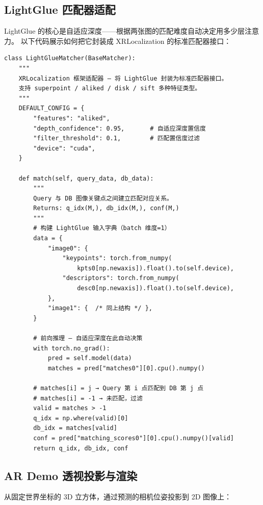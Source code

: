 \documentclass[12pt,a4paper]{ctexart}
\begin{document}
\subsection{LightGlue 匹配器适配}

LightGlue 的核心是自适应深度——根据两张图的匹配难度自动决定用多少层注意力。
以下代码展示如何把它封装成 XRLocalization 的标准匹配器接口：

\begin{lstlisting}[style=pythonstyle, caption={LightGlue 匹配器适配代码}]
class LightGlueMatcher(BaseMatcher):
    """
    XRLocalization 框架适配器 — 将 LightGlue 封装为标准匹配器接口。
    支持 superpoint / aliked / disk / sift 多种特征类型。
    """
    DEFAULT_CONFIG = {
        "features": "aliked",
        "depth_confidence": 0.95,       # 自适应深度置信度
        "filter_threshold": 0.1,        # 匹配置信度过滤
        "device": "cuda",
    }

    def match(self, query_data, db_data):
        """
        Query 与 DB 图像关键点之间建立匹配对应关系。
        Returns: q_idx(M,), db_idx(M,), conf(M,)
        """
        # 构建 LightGlue 输入字典（batch 维度=1）
        data = {
            "image0": {
                "keypoints": torch.from_numpy(
                    kpts0[np.newaxis]).float().to(self.device),
                "descriptors": torch.from_numpy(
                    desc0[np.newaxis]).float().to(self.device),
            },
            "image1": {  /* 同上结构 */ },
        }

        # 前向推理 — 自适应深度在此自动决策
        with torch.no_grad():
            pred = self.model(data)
            matches = pred["matches0"][0].cpu().numpy()

        # matches[i] = j → Query 第 i 点匹配到 DB 第 j 点
        # matches[i] = -1 → 未匹配，过滤
        valid = matches > -1
        q_idx = np.where(valid)[0]
        db_idx = matches[valid]
        conf = pred["matching_scores0"][0].cpu().numpy()[valid]
        return q_idx, db_idx, conf
\end{lstlisting}

\subsection{AR Demo 透视投影与渲染}

从固定世界坐标的 3D 立方体，通过预测的相机位姿投影到 2D 图像上：
\end{document}
